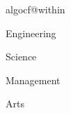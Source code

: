 \renewcommand{\thetable}{\arabic{chapter}-\arabic{table}}%
\renewcommand{\theequation}{\arabic{chapter}-\arabic{equation}}%

\renewcommand{\algorithmcfname}{算法}
\setlength\AlCapSkip{1.2ex}
\SetAlgoSkip{1pt}
\renewcommand{\algocf@captiontext}[2]{#1\algocf@typo ~ \AlCapFnt{}#2} %
\expandafter\ifx\csname algocf@within\endcsname\relax%
\renewcommand\thealgocf{\@arabic\c@algocf} %
\else%
\renewcommand\thealgocf{\csname the\algocf@within\endcsname-\@arabic\c@algocf}
\fi

\makeatother
\def \xuekeEngineering {Engineering}
\def \xuekeScience {Science}
\def \xuekeManagement {Management}
\def \xuekeArts {Arts}

\ifx \xueke \xuekeEngineering
\newcommand{\cxueke}{工学}
\newcommand{\exueke}{Engineering}
\fi

\ifx \xueke \xuekeScience
\newcommand{\cxueke}{理学}
\newcommand{\exueke}{Science}
\fi

\ifx \xueke \xuekeManagement
\newcommand{\cxueke}{管理学}
\newcommand{\exueke}{Management}
\fi

\ifx \xueke \xuekeArts
\newcommand{\cxueke}{文学}
\newcommand{\exueke}{Arts}
\fi

\newcommand{\cdash}{\mbox{—\!\!\!\!—\!\!\!\!—}}%
\newcommand{\dif}{\mathrm{d}}%
